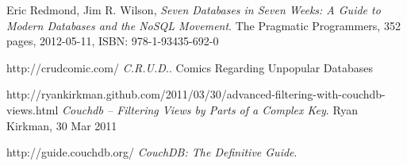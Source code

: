 \begin{thebibliography}{9}

  Eric Redmond, Jim R. Wilson,
  \emph{Seven Databases in Seven Weeks: A Guide to Modern Databases and the NoSQL Movement}.
  The Pragmatic Programmers,
  352 pages, 2012-05-11, 
  ISBN: 978-1-93435-692-0
  
  http://crudcomic.com/
  \emph{C.R.U.D.}.
  Comics Regarding Unpopular Databases
  
  http://ryankirkman.github.com/2011/03/30/advanced-filtering-with-couchdb-views.html
  \emph{Couchdb – Filtering Views by Parts of a Complex Key}.
  Ryan Kirkman, 30 Mar 2011

  http://guide.couchdb.org/
  \emph{CouchDB: The Definitive Guide}.  
  

\end{thebibliography}